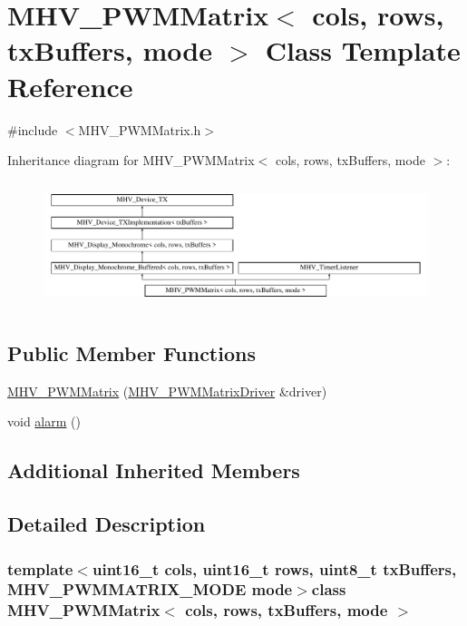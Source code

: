 \hypertarget{class_m_h_v___p_w_m_matrix}{\section{M\-H\-V\-\_\-\-P\-W\-M\-Matrix$<$ cols, rows, tx\-Buffers, mode $>$ Class Template Reference}
\label{class_m_h_v___p_w_m_matrix}
}


{\ttfamily \#include $<$M\-H\-V\-\_\-\-P\-W\-M\-Matrix.\-h$>$}

Inheritance diagram for M\-H\-V\-\_\-\-P\-W\-M\-Matrix$<$ cols, rows, tx\-Buffers, mode $>$\-:\begin{figure}[H]
\begin{center}
\leavevmode
\includegraphics[height=3.713528cm]{class_m_h_v___p_w_m_matrix}
\end{center}
\end{figure}
\subsection*{Public Member Functions}
\begin{DoxyCompactItemize}
\item 
\hyperlink{class_m_h_v___p_w_m_matrix_a733b7f593c17a66b336dffba09ae56c3}{M\-H\-V\-\_\-\-P\-W\-M\-Matrix} (\hyperlink{class_m_h_v___p_w_m_matrix_driver}{M\-H\-V\-\_\-\-P\-W\-M\-Matrix\-Driver} \&driver)
\item 
void \hyperlink{class_m_h_v___p_w_m_matrix_ae11cb2d0a6c05b5b9334d2b453f7b7e9}{alarm} ()
\end{DoxyCompactItemize}
\subsection*{Additional Inherited Members}


\subsection{Detailed Description}
\subsubsection*{template$<$uint16\-\_\-t cols, uint16\-\_\-t rows, uint8\-\_\-t tx\-Buffers, M\-H\-V\-\_\-\-P\-W\-M\-M\-A\-T\-R\-I\-X\-\_\-\-M\-O\-D\-E mode$>$class M\-H\-V\-\_\-\-P\-W\-M\-Matrix$<$ cols, rows, tx\-Buffers, mode $>$}

